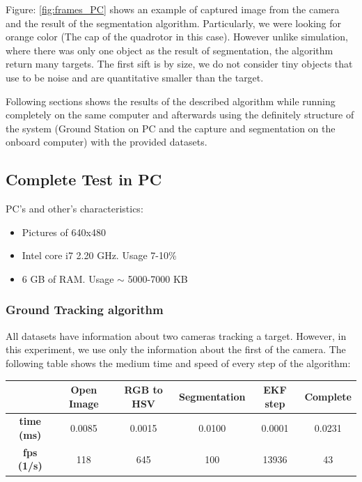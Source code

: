 	Figure: \ref{fig:frames_PC} shows an example of captured image from the camera and the result of the segmentation algorithm. Particularly, we were looking for orange color (The cap of the quadrotor in this case). However unlike simulation, where there was only one object as the result of segmentation, the algorithm return many targets. The first sift is by size, we do not consider tiny objects that use to be noise and are quantitative smaller than the target.
		
	
	Following sections shows the results of the described algorithm while running completely on the same computer and afterwards using the definitely structure of the system (Ground Station on PC and the capture and segmentation on the onboard computer) with the provided datasets.

\subsection{Complete Test in PC}
	PC's and other's characteristics:
	\begin{itemize}
		\item{Pictures of 640x480}
		\item{Intel core i7 2.20 GHz. Usage 7-10\%}
		\item{6 GB of RAM. Usage $\sim$ 5000-7000 KB}
	\end{itemize}
	\subsubsection{Ground Tracking algorithm}
	
	All datasets have information about two cameras tracking a target. However, in this experiment, we use only the information about the first  of the camera. The following table shows the medium time and speed of every step of the algorithm: \\
	
	{
	\centering
		\begin{tabular}{|c|c|c|c|c||c|}
		\hline  					&  Open Image	&  RGB to HSV 	& Segmentation 	& EKF step  & Complete \\ 
		\hline  \textbf{time (ms)}	& 0.0085 		& 0.0015 		& 0.0100 		& 0.0001 	& 0.0231 	\\ 
		\hline  \textbf{fps (1/s)}	&  118			&  645			&  100			& 13936 	& 43 		\\ 
		\hline 
		\end{tabular} 
	}
	\newline

